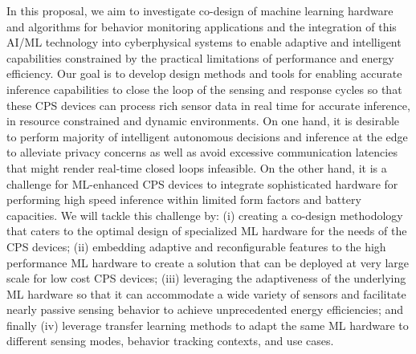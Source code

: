 In this proposal, we aim to investigate co-design of machine learning hardware and algorithms for behavior monitoring applications and the integration of this AI/ML technology into cyberphysical systems to enable adaptive and intelligent capabilities constrained by the practical limitations of performance and energy efficiency. 
Our goal is to develop design methods and tools for enabling accurate inference capabilities to close the loop of the sensing and response cycles so that these CPS devices can process rich sensor data in real time for accurate inference, in resource constrained and dynamic environments. 
On one hand, it is desirable to perform majority of intelligent autonomous decisions and inference at the edge to alleviate privacy concerns as well as avoid excessive communication latencies that might render real-time closed loops infeasible. 
On the other hand, it is a challenge for ML-enhanced CPS devices to integrate sophisticated hardware for performing high speed inference within limited form factors and battery capacities. 
We will tackle this challenge by: 
(i) creating a co-design methodology that caters to the optimal design of specialized ML hardware for the needs of the CPS devices; 
(ii) embedding adaptive and reconfigurable features to the high performance ML hardware to create a solution that can be deployed at very large scale for low cost CPS devices; 
(iii) leveraging the adaptiveness of the underlying ML hardware so that it can accommodate a wide variety of sensors and facilitate nearly passive sensing behavior to achieve unprecedented energy efficiencies; 
and finally (iv) leverage transfer learning methods to adapt the same ML hardware to different sensing modes, behavior tracking contexts, and use cases.       

